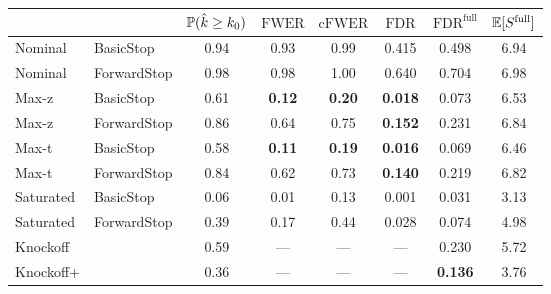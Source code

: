
\newcommand{\guarantee}[1]{{\bf #1}}
{\small 
\begin{tabular}{|l l|cccccc|}
\hline
{} & {} &  $\mathbb{P}(\hat{k} \geq k_0)$ &  $\text{FWER}$ &  $\text{cFWER}$ &  $\text{FDR}$ &  $\text{FDR}^{\text{full}}$ &  $\mathbb{E}[S^{\text{full}}]$ \\ \hline
Nominal & BasicStop & 0.94 & 0.93 & 0.99 & 0.415 & 0.498 & 6.94 \\ 
Nominal & ForwardStop & 0.98 & 0.98 & 1.00 & 0.640 & 0.704 & 6.98 \\ 
Max-z & BasicStop & 0.61 & \guarantee{0.12} & \guarantee{0.20} & \guarantee{0.018} & 0.073 & 6.53 \\ 
Max-z & ForwardStop & 0.86 & 0.64 & 0.75 & \guarantee{0.152} & 0.231 & 6.84 \\ 
Max-t & BasicStop & 0.58 & \guarantee{0.11} & \guarantee{0.19} & \guarantee{0.016} & 0.069 & 6.46 \\ 
Max-t & ForwardStop & 0.84 & 0.62 & 0.73 & \guarantee{0.140} & 0.219 & 6.82 \\ 
Saturated & BasicStop & 0.06 & 0.01 & 0.13 & 0.001 & 0.031 & 3.13 \\ 
Saturated & ForwardStop & 0.39 & 0.17 & 0.44 & 0.028 & 0.074 & 4.98 \\ 
Knockoff & & 0.59 & --- & --- & --- & 0.230 & 5.72 \\ 
Knockoff+ & & 0.36 & --- & --- & --- & \guarantee{0.136} & 3.76 \\  \hline
\end{tabular}}